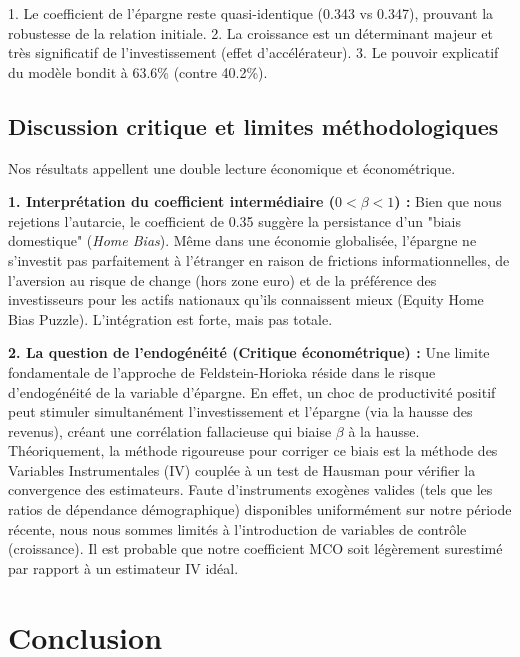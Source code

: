 \documentclass[12pt, a4paper]{article}
\begin{document}
1. Le coefficient de l'épargne reste quasi-identique (0.343 vs 0.347), prouvant la robustesse de la relation initiale.
2. La croissance est un déterminant majeur et très significatif de l'investissement (effet d'accélérateur).
3. Le pouvoir explicatif du modèle bondit à 63.6\% (contre 40.2\%).

\subsection{Discussion critique et limites méthodologiques}

Nos résultats appellent une double lecture économique et économétrique.

\textbf{1. Interprétation du coefficient intermédiaire ($0 < \beta < 1$) :}
Bien que nous rejetions l'autarcie, le coefficient de 0.35 suggère la persistance d'un "biais domestique" (\textit{Home Bias}). Même dans une économie globalisée, l'épargne ne s'investit pas parfaitement à l'étranger en raison de frictions informationnelles, de l'aversion au risque de change (hors zone euro) et de la préférence des investisseurs pour les actifs nationaux qu'ils connaissent mieux (Equity Home Bias Puzzle). L'intégration est forte, mais pas totale.

\textbf{2. La question de l'endogénéité (Critique économétrique) :}
Une limite fondamentale de l'approche de Feldstein-Horioka réside dans le risque d'endogénéité de la variable d'épargne. En effet, un choc de productivité positif peut stimuler simultanément l'investissement et l'épargne (via la hausse des revenus), créant une corrélation fallacieuse qui biaise $\beta$ à la hausse.
Théoriquement, la méthode rigoureuse pour corriger ce biais est la méthode des Variables Instrumentales (IV) couplée à un test de Hausman pour vérifier la convergence des estimateurs. Faute d'instruments exogènes valides (tels que les ratios de dépendance démographique) disponibles uniformément sur notre période récente, nous nous sommes limités à l'introduction de variables de contrôle (croissance). Il est probable que notre coefficient MCO soit légèrement surestimé par rapport à un estimateur IV idéal.
\section{Conclusion}
\end{document}
